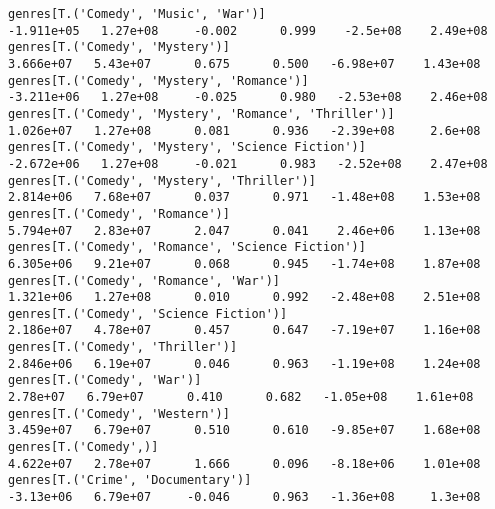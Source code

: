 \documentclass[11pt]{article}
\begin{document}
\begin{Verbatim}[commandchars=\\\{\}]
genres[T.('Comedy', 'Music', 'War')]                                                                         -1.911e+05   1.27e+08     -0.002      0.999    -2.5e+08    2.49e+08
genres[T.('Comedy', 'Mystery')]                                                                               3.666e+07   5.43e+07      0.675      0.500   -6.98e+07    1.43e+08
genres[T.('Comedy', 'Mystery', 'Romance')]                                                                   -3.211e+06   1.27e+08     -0.025      0.980   -2.53e+08    2.46e+08
genres[T.('Comedy', 'Mystery', 'Romance', 'Thriller')]                                                        1.026e+07   1.27e+08      0.081      0.936   -2.39e+08     2.6e+08
genres[T.('Comedy', 'Mystery', 'Science Fiction')]                                                           -2.672e+06   1.27e+08     -0.021      0.983   -2.52e+08    2.47e+08
genres[T.('Comedy', 'Mystery', 'Thriller')]                                                                   2.814e+06   7.68e+07      0.037      0.971   -1.48e+08    1.53e+08
genres[T.('Comedy', 'Romance')]                                                                               5.794e+07   2.83e+07      2.047      0.041    2.46e+06    1.13e+08
genres[T.('Comedy', 'Romance', 'Science Fiction')]                                                            6.305e+06   9.21e+07      0.068      0.945   -1.74e+08    1.87e+08
genres[T.('Comedy', 'Romance', 'War')]                                                                        1.321e+06   1.27e+08      0.010      0.992   -2.48e+08    2.51e+08
genres[T.('Comedy', 'Science Fiction')]                                                                       2.186e+07   4.78e+07      0.457      0.647   -7.19e+07    1.16e+08
genres[T.('Comedy', 'Thriller')]                                                                              2.846e+06   6.19e+07      0.046      0.963   -1.19e+08    1.24e+08
genres[T.('Comedy', 'War')]                                                                                    2.78e+07   6.79e+07      0.410      0.682   -1.05e+08    1.61e+08
genres[T.('Comedy', 'Western')]                                                                               3.459e+07   6.79e+07      0.510      0.610   -9.85e+07    1.68e+08
genres[T.('Comedy',)]                                                                                         4.622e+07   2.78e+07      1.666      0.096   -8.18e+06    1.01e+08
genres[T.('Crime', 'Documentary')]                                                                            -3.13e+06   6.79e+07     -0.046      0.963   -1.36e+08     1.3e+08

\end{Verbatim}
\end{document}
